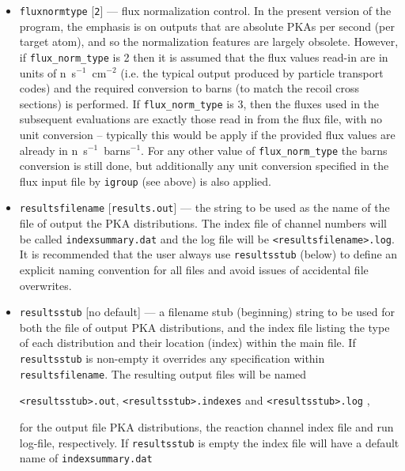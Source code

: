 \documentclass[a4paper]{article}
\begin{document}
\begin{itemize}
\item \texttt{flux{\textunderscore}norm{\textunderscore}type} [\texttt{2}] --- flux normalization control. In the present version of the program, the emphasis is on outputs that are absolute PKAs per second (per target atom), and so the normalization features are largely obsolete. However, if \verb|flux_norm_type| is 2 then it is assumed that the flux values read-in are in units of n~s\(^{-1}\)~cm\(^{-2}\) (i.e. the typical output produced by particle transport codes) and the required conversion to barns (to match the recoil cross sections) is performed. If \verb|flux_norm_type| is 3, then the fluxes used in the subsequent evaluations are exactly those read in from the flux file, with no unit conversion -- typically this would be apply if the provided flux values are already in n~s\(^{-1}\)~barns\(^{-1}\). For any other value of \verb|flux_norm_type| the barns conversion is still done, but additionally any unit conversion specified in the flux input file by \texttt{igroup} (see above) is also applied.
\item \texttt{results{\textunderscore}filename} [\texttt{results.out}] --- the string to be used as the name of the file of output the PKA distributions. The index file of channel numbers will be called \texttt{index{\textunderscore}summary.dat} and the log file will be \texttt{<results{\textunderscore}filename>.log}. It is recommended that the user always use \texttt{results{\textunderscore}stub} (below) to define an explicit naming convention for all files and avoid issues of accidental file overwrites.
\item \texttt{results{\textunderscore}stub} [no default] --- a filename stub (beginning) string to be used for both the file of output PKA distributions, and the index file listing the type of each distribution and their location (index) within the main file. If \texttt{results{\textunderscore}stub} is non-empty it overrides any specification within \texttt{results{\textunderscore}filename}. The resulting output files will be named{\begin{center}\texttt{<results{\textunderscore}stub>.out}, \texttt{<results{\textunderscore}stub>.indexes} and \texttt{<results{\textunderscore}stub>.log} ,\end{center}}for the output file PKA distributions, the reaction channel index file and run log-file, respectively. If \texttt{results{\textunderscore}stub} is empty the index file will have a default name of \texttt{index{\textunderscore}summary.dat}

\end{itemize}
\end{document}
